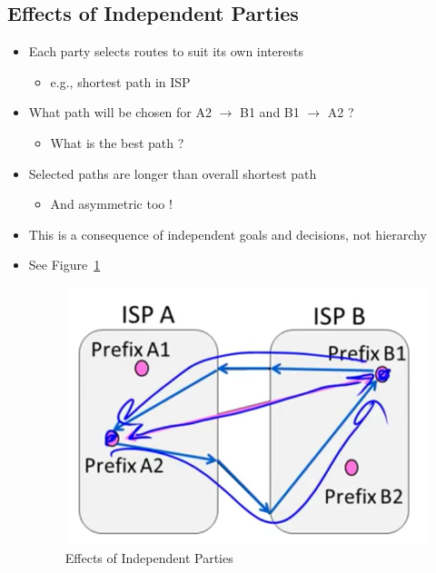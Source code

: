 \documentclass[12pt]{ctexart}   %
\begin{document}
	\subsection{Effects of Independent Parties}
	\begin{itemize}
		\item Each party selects routes to suit its own interests
		\begin{itemize}
			\item e.g., shortest path in ISP
		\end{itemize}
		\item What path will be chosen for A2 $\rightarrow$ B1 and B1 $\rightarrow$ A2 ?
		\begin{itemize}
			\item What is the best path ?
		\end{itemize}
		
		\item Selected paths are longer than overall shortest path
		\begin{itemize}
			\item And asymmetric too !
		\end{itemize}
		
		\item This is a consequence of independent goals and decisions, not hierarchy
		\item See Figure~\ref{fig:5-11-3}
			
		\begin{figure}[h!] %
		\centering
		 \includegraphics[scale=0.7]{images/5-11-3}
		\caption{ Effects of Independent Parties }
		 \label{fig:5-11-3}
		 \end{figure}
	\end{itemize}
	
\end{document}
